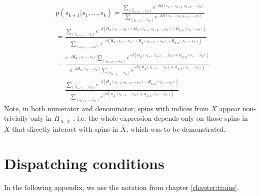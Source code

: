 \begin{align}
   & p(s_{k+1}|s_1, \ldots, s_k) = \frac{\sum\limits_{(z_{k+2}, \ldots, z_N)}e^{-\beta H(s_1, \ldots, s_{k+1}, z_{k+2},\ldots,z_N)}}{\sum\limits_{(z_{k+1}, \ldots, z_N)}e^{-\beta H(s_1, \ldots, s_k, z_{k+1},\ldots,z_N)}}                                                                                                                         \\
   & = \frac{\sum\limits_{(z_{k+2}, \ldots, z_N)}e^{-\beta (H_X(s_1, \ldots, s_k) + H_{\overline{X}}(s_{k+1}, z_{k+2},\ldots,z_N) + H_{X, \overline{X}}(s_1, \ldots, z_N))}}{\sum\limits_{(z_{k+1}, \ldots, z_N)}e^{-\beta (H_X(s_1, \ldots, s_k) + H_{\overline{X}}(z_{k+1}, \ldots,z_N) + H_{X, \overline{X}}(s_1, \ldots, z_N))}}                 \\
   & = \frac{e^{-\beta H_X(s_1, \ldots, s_k)}\sum\limits_{(z_{k+2}, \ldots, z_N)} e^{-\beta(H_{\overline{X}}(s_{k+1}, z_{k+2},\ldots,z_N) + H_{X, \overline{X}}(s_1, \ldots, z_N))}}{e^{-\beta H_X(s_1, \ldots, s_k)}\sum\limits_{(z_{k+1}, \ldots, z_N)}e^{ -\beta(H_{\overline{X}}(z_{k+1}, \ldots,z_N) + H_{X, \overline{X}}(s_1, \ldots, z_N))}} \\
   & = \frac{\sum\limits_{(z_{k+2}, \ldots, z_N)} e^{-\beta(H_{\overline{X}}(s_{k+1}, z_{k+2},\ldots,z_N) + H_{X, \overline{X}}(s_1, \ldots, z_N))}}{\sum\limits_{(z_{k+1}, \ldots, z_N)}e^{ -\beta(H_{\overline{X}}(z_{k+1}, \ldots,z_N) + H_{X, \overline{X}}(s_1, \ldots, z_N))}}
\end{align}
Note, in both numerator and denominator, spins with indices from $X$ appear
non-trivially only in $H_{X, \overline{X}}$ , i.e. the whole expression depends
only on those spins in $X$ that directly interact with spins in $\overline{X}$,
which was to be demonstrated.

\chapter{Dispatching conditions}
\label{chapter:dispatching}
In the following appendix, we use the notation from chapter \ref{chapter:trains}.
